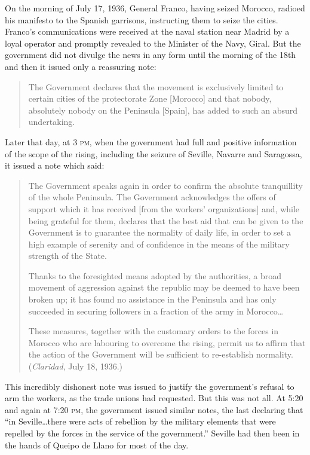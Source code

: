 On the morning of July 17, 1936, General Franco, having seized Morocco, radioed his manifesto to the Spanish garrisons, instructing them to seize the cities. Franco’s communications were received at the naval station near Madrid by a loyal operator and promptly revealed to the Minister of the Navy, Giral. But the government did not divulge the news in any form until the morning of the 18th and then it issued only a reassuring note:
\begin{quote}
  The Government declares that the movement is exclusively limited to certain cities of the protectorate Zone [Morocco] and that nobody, absolutely nobody on the Peninsula [Spain], has added to such an absurd undertaking.
\end{quote}
Later that day, at 3 \textsc{pm}, when the government had full and positive information of the scope of the rising, including the seizure of Seville, Navarre and Saragossa, it issued a note which said:
\begin{quote}
  The Government speaks again in order to confirm the absolute tranquillity of the whole Peninsula. The Government acknowledges the offers of support which it has received [from the workers’ organizations] and, while being grateful for them, declares that the best aid that can be given to the Government is to guarantee the normality of daily life, in order to set a high example of serenity and of confidence in the means of the military strength of the State.
  
  Thanks to the foresighted means adopted by the authorities, a broad movement of aggression against the republic may be deemed to have been broken up; it has found no assistance in the Peninsula and has only succeeded in securing followers in a fraction of the army in Morocco\ldots
  
  These measures, together with the customary orders to the forces in Morocco who are labouring to overcome the rising, permit us to affirm that the action of the Government will be sufficient to re-establish normality. (\emph{Claridad}, July 18, 1936.)
\end{quote}

This incredibly dishonest note was issued to justify the government’s refusal to arm the workers, as the trade unions had requested. But this was not all. At 5:20 and again at 7:20 \textsc{pm}, the government issued similar notes, the last declaring that ``in Seville\ldots there were acts of rebellion by the military elements that were repelled by the forces in the service of the government.'' Seville had then been in the hands of Queipo de Llano for most of the day.

